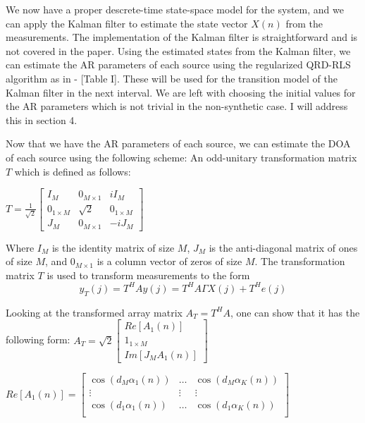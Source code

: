 \documentclass{article}
\begin{document}
We now have a proper descrete-time state-space model for the system, and we can apply the Kalman filter to estimate the state vector $X(n)$ from the measurements.
The implementation of the Kalman filter is straightforward and is not covered in the paper.
Using the estimated states from the Kalman filter, we can estimate the AR parameters of each source using the regularized QRD-RLS algorithm as in \cite{RQRD_RLS_ALG} - [Table I].
These will be used for the transition model of the Kalman filter in the next interval. We are left with choosing the initial values for the AR parameters which is not trivial in the non-synthetic case.
I will address this in section 4.

Now that we have the AR parameters of each source, we can estimate the DOA of each source using the following scheme:
An odd-unitary transformation matrix $T$ which is defined as follows:

\vspace{1em}
$ T = \frac{1}{\sqrt{2}} \begin{bmatrix}
    I_M & 0_{M\times1} & iI_M \\
    0_{1\times M} & \sqrt{2} & 0_{1\times M}\\
    J_M & 0_{M\times1} & -iJ_M
\end{bmatrix}$
\vspace{1em}

Where $I_M$ is the identity matrix of size $M$, $J_M$ is the anti-diagonal matrix of ones of size $M$, and $0_{M\times1}$ is a column vector of zeros of size $M$.
The transformation matrix $T$ is used to transform measurements to the form
\begin{equation}
    y_T(j) = T^H A y(j) = T^H A \Gamma X(j) + T^H e(j)
\end{equation}

Looking at the transformed array matrix $A_T = T^H A$, one can show that it has the following form:
\vspace{1em}
$A_T = \sqrt{2}\begin{bmatrix}
    Re[A_1(n)] \\
    1_{1\times M} \\
    Im[J_M A_1(n)]
\end{bmatrix}$
\vspace{1em}

$Re[A_1(n)] = \begin{bmatrix}
    \cos(d_M\alpha_1(n)) & \dots & \cos(d_M\alpha_K(n)) \\
    \vdots & \vdots & \vdots \\
    \cos(d_1\alpha_1(n)) & \dots & \cos(d_1\alpha_K(n)) \\
\end{bmatrix}$
\vspace{1em}
\end{document}
